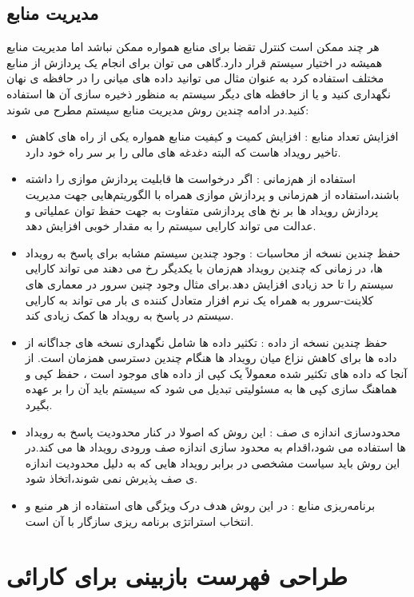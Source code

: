 \subsection{مدیریت منابع}
هر چند ممکن است کنترل تقضا برای منابع همواره ممکن نباشد اما مدیریت منابع همیشه در اختیار سیستم قرار دارد.گاهی می توان برای انجام یک پردازش از منابع مختلف استفاده کرد به عنوان مثال می توانید داده های میانی را در حافظه ی نهان نگهداری کنید و یا از حافظه های دیگر سیستم به منظور ذخیره سازی آن ها استفاده کنید.در ادامه چندین روش مدیریت منابع سیستم مطرح می شوند:
\begin{itemize}
\item
افزایش تعداد منابع : افزایش کمیت و کیفیت منابع همواره یکی از راه های کاهش تاخیر رویداد هاست که البته دغدغه های مالی را بر سر راه خود دارد.
\item 
استفاده از هم‌زمانی : اگر درخواست ها قابلیت پردازش موازی را داشته باشند،‌استفاده از هم‌زمانی و پردازش موازی همراه با الگوریتم‌هایی جهت مدیریت پردازش رویداد ها بر نخ های پردازشی متفاوت به جهت حفظ توان عملیاتی و عدالت می تواند کارایی سیستم را به مقدار خوبی افزایش دهد.
\item
حفظ چندین نسخه از محاسبات : وجود چندین سیستم مشابه برای پاسخ به رویداد ها، در زمانی که چندین رویداد هم‌زمان با یکدیگر رخ می دهند می تواند کارایی سیستم را تا حد زیادی افزایش دهد.برای مثال وجود چنین سرور در معماری های کلاینت-سرور به همراه یک نرم افزار متعادل کننده ی بار می تواند به کارایی سیستم در پاسخ به رویداد ها کمک زیادی کند.
\item 
حفظ چندین نسخه از داده : تکثیر داده ها شامل نگهداری نسخه های جداگانه از داده ها برای کاهش نزاع میان رویداد ها هنگام چندین دسترسی همزمان است. از آنجا که داده های تکثیر شده معمولاً یک کپی از داده های موجود است ، حفظ کپی و هماهنگ سازی کپی ها به مسئولیتی تبدیل می شود که سیستم باید آن را بر عهده بگیرد.
\item
محدود‌سازی اندازه ی صف : این روش که اصولا در کنار محدودیت پاسخ به رویداد ها استفاده می شود،‌اقدام به محدود سازی اندازه صف ورودی رویداد ها می کند.در این روش باید سیاست مشخصی در برابر رویداد هایی که به دلیل محدودیت اندازه ی صف پذیرش نمی شوند،‌اتخاذ شود.
\item
برنامه‌ریزی منابع : در این روش هدف درک ویژگی های استفاده از هر منبع و انتخاب استراتژی برنامه ریزی سازگار با آن است.
\end{itemize}
\section{طراحی فهرست بازبینی برای کارائی}

